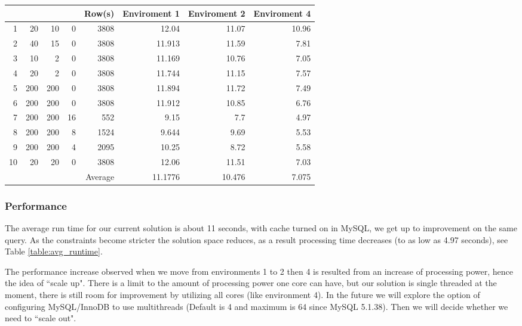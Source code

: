 \documentclass[journal]{IEEEtran}
\begin{document}
\begin{table*}[htbp]
\begin{center}\caption{AVERAGE RUNTIME } \label{table:avg_runtime}
\begin{tabular}{|r|r|r|r|r|r|r|r|}
\hline
\textbf{} &  \textbf{ } &  \textbf{ }&  \textbf{}&  Row(s) &  Enviroment 1&  Enviroment 2&  Enviroment 4\\
\hline 1 & 20 & 10 & 0 & 3808 & 12.04 & 11.07 & 10.96   \\
\hline 2 & 40 & 15 & 0 & 3808 & 11.913 & 11.59 & 7.81\\
\hline 3 & 10 & 2 & 0 & 3808 & 11.169 & 10.76 & 7.05 \\
\hline 4 & 20 & 2 & 0  & 3808 & 11.744 & 11.15 & 7.57 \\
\hline 5 & 200 & 200 & 0  & 3808 & 11.894 & 11.72 & 7.49 \\
\hline 6 & 200 & 200 & 0  & 3808 & 11.912 & 10.85 & 6.76 \\
\hline 7 & 200 & 200 & 16  & 552 & 9.15 & 7.7 & 4.97 \\
\hline 8 & 200 & 200 & 8  & 1524 & 9.644& 9.69 & 5.53 \\
\hline 9 & 200 & 200 & 4  & 2095 & 10.25 & 8.72 & 5.58 \\
\hline 10 & 20 & 20 & 0  & 3808 & 12.06 & 11.51 & 7.03 \\
\hline \multicolumn{5}{|r|}{Average} & 11.1776 & 10.476 & 7.075\\
\hline
\end{tabular}
\end{center}
\end{table*} 


\subsubsection{Performance}

The average run time for our current solution is about 11 seconds, with cache turned on in MySQL, we get up to  improvement on the same query. As the constraints become stricter the solution space reduces, as a result processing time decreases (to as low as 4.97 seconds), see Table \ref{table:avg_runtime}.

The performance increase observed when we move from environments 1 to 2 then 4 is resulted from an increase of processing power, hence the idea of ``scale up". There is a limit to the amount of processing power one core can have, but our solution is single threaded at the moment, there is still room for improvement by utilizing all cores (like environment 4).  In the future we will explore the option of configuring MySQL/InnoDB to use multithreads (Default is 4 and maximum is 64 since MySQL 5.1.38). Then we will decide whether we need to ``scale out". 
\end{document}

